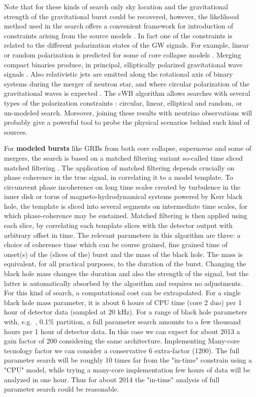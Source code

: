 Note that for these kinds of search only sky location and the gravitational strength of the gravitational burst could be recovered, however, the likelihood method used in the search offers a convenient framework for introduction of constraints arising from the source models \cite{KLIMENKO2011}. In fact one of the   constraints is related to the different polarization states of the GW signals. For example, linear or random polarization is predicted for  some of core collapse models \cite{LINEARPOLAR}. Merging compact binaries    produce, in principal,  elliptically polarized gravitational wave signals \cite{RANDOMPOLAR}. Also relativistic jets are emitted along the rotational axis of binary systems during the merger of neutron star, and where circular polarization of the gravitational waves is expected \cite{MERGINGBIN}.  The cWB algorithm allows searches with several types of the polarization constraints : circular, linear, elliptical and random, or un-modeled search\cite{KLIMENKO2011}. Moreover, joining these results with neutrino observations will probably give a powerful tool to probe the physical scenarios behind such kind of sources. 



For {\bf modeled bursts} like GRBs from both core collapse,  supernovae and some of mergers, the search is based on a matched filtering variant so-called time sliced matched filtering \cite{MAURICE2011}.  The application of matched filtering depends crucially on phase coherence in the true signal, in correlating it to a model template.  To circumvent phase incoherence on long time scales created by turbulence in the inner disk or torus of magneto-hydrodynamical systems powered by Kerr black hole,   
the template is sliced  into several segments on intermediate time scales, for which phase-coherence may be sustained.
 Matched filtering is then applied using each slice, by correlating each template slices with the detector output with arbitrary offset  in time.
The relevant parameters in this algorithm are three: a choice of coherence time  which can be  course grained, fine grained time of onset(s) of the (slices of the) burst and the mass of the black hole. The mass is equivalent, for all practical purposes, to the duration of the burst. Changing the black hole mass changes the duration and also the  strength of the signal, but the latter is automatically absorbed by the algorithm and requires no adjustments.  
For this kind of search, a computational cost can be extrapolated. For a single black hole mass parameter, it is about 6 hours of CPU time (core 2 duo) per 1 hour of detector data (sampled at 20 kHz). For a range  of black hole parameters with, e.g.\ , 0.1$\%$ partition, a full parameter search amounts to a few thousand  hours per 1 hour of detector data. In this case we can expect for about 2013  a gain factor of 200 considering the same architecture. Implementing Many-core tecnology factor we can consider a conservative 6 extra-factor (1200). The full parameter search will be roughly 10 times far from the "in-time" constrain using a "CPU" model, while trying a many-core implementation few hours of data will be analyzed in one hour. Thus for about  2014 the "in-time" analysis of full parameter search could be reasonable.          


